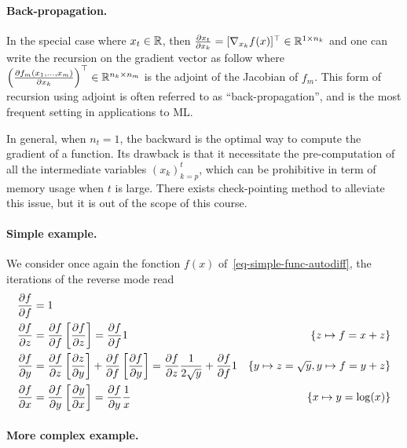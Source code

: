 \paragraph{Back-propagation.}

In the special case where $x_t \in \mathbb{R}$, then $\frac{ \partial x_t}{\partial x_k} = [\nabla_{x_k} f(x)]^\top \in \mathbb{R}^{1 \times n_k}$ and one can write the recursion on the gradient vector as follow 
where $\left( \frac{ \partial f_m(x_1,\ldots,x_m)}{\partial x_k} \right)^\top \in \mathbb{R}^{n_k \times n_m}$ is the adjoint of the Jacobian of $f_m$. This form of recursion using adjoint is often referred to as ``back-propagation'', and is the most frequent setting in applications to ML.

In general, when $n_t=1$, the backward is the optimal way to compute the gradient of a function. Its drawback is that it necessitate the pre-computation of all the intermediate variables $(x_k)_{k=p}^t$, which can be prohibitive in term of memory usage when $t$ is large. There exists check-pointing method to alleviate this issue, but it is out of the scope of this course.

\paragraph{Simple example.}

We consider once again the fonction $f(x)$ of~\eqref{eq-simple-func-autodiff}, the iterations of the reverse mode read
\begin{align*}
		\frac{ \partial f}{\partial f} &= 1 &\\
		\frac{ \partial f}{\partial z} &= \frac{ \partial f}{\partial f} \left[\frac{ \partial f}{\partial z}\right] = \frac{ \partial f}{\partial f} 1 &
			\{z \mapsto f = x+z\}\\
		\frac{ \partial f}{\partial y} &= \frac{ \partial f}{\partial z} \left[\frac{ \partial z}{\partial y}\right] + \frac{ \partial f}{\partial f} \left[\frac{ \partial f}{\partial y}\right] = \frac{ \partial f}{\partial z} \frac{1}{2\sqrt{y}} + \frac{ \partial f}{\partial f} 1 & 
			\{ y \mapsto z=\sqrt{y}, y \mapsto f=y+z\} \\
		\frac{ \partial f}{\partial x} &= \frac{ \partial f}{\partial y} \left[\frac{ \partial y}{\partial x}\right] = \frac{ \partial f}{\partial y} \frac{1}{x} & 
			\{ x \mapsto y=\log(x)\}
\end{align*}

\paragraph{More complex example.}

